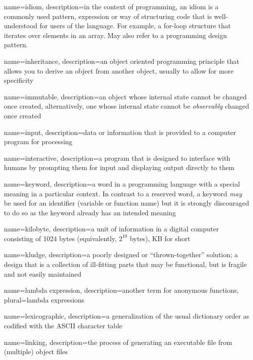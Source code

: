 {
  name=idiom,
  description={in the context of programming, an idiom is a commonly used pattern, expression or way of structuring code that is well-understood for users of the language.  For example, a for-loop structure that iterates over elements in an array.  May also refer to a programming design pattern.}
}

{
  name=inheritance,
  description={an object oriented programming principle that allows you to derive an object from another object, usually to allow for more specificity}
}

{
  name=immutable,
  description={an object whose internal state cannot be changed once created, alternatively, one whose internal state
  cannot be \emph{observably} changed once created}
}

{
  name=input,
  description={data or information that is provided to a computer program for processing}
}

{
  name=interactive,
  description={a program that is designed to interface with humans by prompting them for input and displaying output directly to them}
}

{
  name=keyword,
  description={a word in a programming language with a special meaning in a particular context.  In
	contrast to a reserved word, a keyword \emph{may} be used for an identifier (variable or function name)
	but it is strongly discouraged to do so as the keyword already has an intended meaning}
}

{
  name=kilobyte,
  description={a unit of information in a digital computer consisting of 1024 bytes (equivalently, $2^{10}$ bytes), KB for short}
}

{
  name=kludge,
  description={a poorly designed or ``thrown-together'' solution; a design that is a collection of ill-fitting parts that may be functional, but is fragile and not easily maintained}
}

{
  name=lambda expression,
  description={another term for anonymous functions},
  plural=lambda expressions
}

{
  name=lexicographic,
  description={a generalization of the usual dictionary order as codified with the ASCII character table}
}

{
  name=linking,
  description={the process of generating an executable file from (multiple) object files}
}


